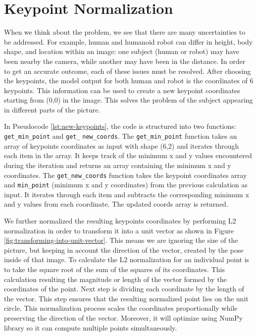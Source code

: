 


\section{Keypoint Normalization}
\label{sec:keypoint-normalization}

When we think about the problem, we see that there are many uncertainties to be addressed. For example, human and humanoid robot can differ in height, body shape, and location within an image: one subject (human or robot) may have been nearby the camera,
while another may have been in the distance. In order to get an accurate outcome, each of these issues must be resolved.
After choosing the keypoints, the model output for both human and robot is the coordinates of 6 keypoints. This information can be used to create a new keypoint coordinates starting from (0,0) in the image. This solves the problem of the subject appearing in different parts of the picture.



In Pseudocode \ref{lst:new-keypoints}, the code is structured into two functions: \verb|get_min_point| and \verb|get_| \verb|new_coords|. The \verb|get_min_point| function takes an array of keypoints coordinates as input with shape (6,2)
and iterates through each item in the array. It keeps track of the minimum x and y values encountered during the iteration and returns an array containing the minimum x and y coordinates.
The \verb|get_new_coords| function takes the keypoint coordinates array and \verb|min_point| (minimum x and y coordinates) from the previous calculation as input. It iterates through each item and subtracts the corresponding minimum x and y values from each coordinate. The updated coords array is returned.

We further normalized the resulting keypoints coordinates by performing L2 normalization in order to transform it into a unit vector as shown in Figure \ref{fig:transforming-into-unit-vector}.
This means we are ignoring the size of the picture, but keeping in account the direction of the vector, created by the pose inside of that image.
To calculate the L2 normalization for an individual point is to take the square root of the sum of the squares of its coordinates. This calculation resulting the magnitude or length of the vector formed by the coordinates of the point.
Next step is dividing each coordinate by the length of the vector. This step ensures that the resulting normalized point lies on the unit circle. This normalization process scales the coordinates proportionally while preserving the direction of the vector. Moreover, it will optimize using NumPy library so it can compute multiple points simultaneously.

